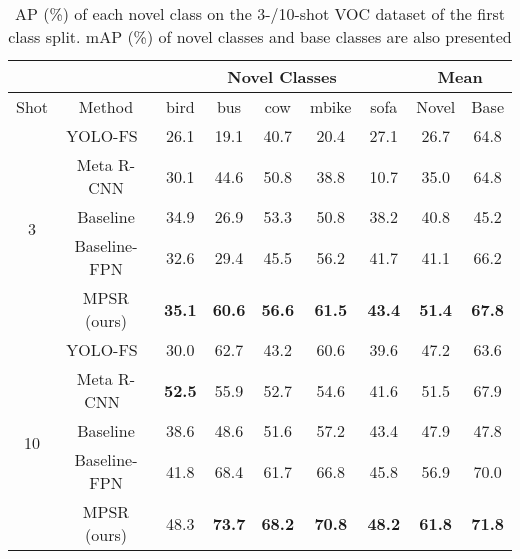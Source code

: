 \documentclass[runningheads]{llncs}
\begin{document}
\setlength{\tabcolsep}{2pt}
\begin{table}
	\begin{center}
		\caption{AP (\%) of each novel class on the 3-/10-shot VOC dataset of the first class split. mAP (\%) of novel classes and base classes are also presented}
		\label{table:detailedvoctable}
		\begin{tabular}{cc|ccccc|cc}
			\hline
			&            & \multicolumn{5}{c|}{Novel Classes}                                            & \multicolumn{2}{c}{Mean}     \\ \hline
			\multicolumn{1}{c|}{Shot}        & Method            & bird          & bus           & cow           & mbike         & sofa          & Novel         & Base          \\ \hline
			\multicolumn{1}{c|}{\multirow{5}{*}{3}}  & YOLO-FS~\cite{yolore}      & 26.1          & 19.1          & 40.7          & 20.4          & 27.1          & 26.7          & 64.8          \\
			\multicolumn{1}{c|}{}                    & Meta R-CNN\cite{metarcnn}   & 30.1          & 44.6          & 50.8          & 38.8          & 10.7          & 35.0          & 64.8          \\
			\multicolumn{1}{c|}{}                    & Baseline     & 34.9          & 26.9          & 53.3          & 50.8          & 38.2          & 40.8          & 45.2          \\
			\multicolumn{1}{c|}{}                    & Baseline-FPN & 32.6          & 29.4          & 45.5          & 56.2          & 41.7          & 41.1          & 66.2          \\
			\multicolumn{1}{c|}{}                    & MPSR (ours)  & \textbf{35.1} & \textbf{60.6} & \textbf{56.6} & \textbf{61.5} & \textbf{43.4} & \textbf{51.4} & \textbf{67.8} \\ \hline
			\multicolumn{1}{c|}{\multirow{5}{*}{10}} & YOLO-FS~\cite{yolore}      & 30.0          & 62.7          & 43.2          & 60.6          & 39.6          & 47.2          & 63.6          \\
			\multicolumn{1}{c|}{}                    & Meta R-CNN~\cite{metarcnn}   & \textbf{52.5} & 55.9          & 52.7          & 54.6          & 41.6          & 51.5          & 67.9          \\
			\multicolumn{1}{c|}{}                    & Baseline     & 38.6          & 48.6          & 51.6          & 57.2          & 43.4          & 47.9          & 47.8          \\
			\multicolumn{1}{c|}{}                    & Baseline-FPN & 41.8          & 68.4          & 61.7          & 66.8          & 45.8          & 56.9          & 70.0          \\
			\multicolumn{1}{c|}{}                    & MPSR (ours)  & 48.3          & \textbf{73.7} & \textbf{68.2} & \textbf{70.8} & \textbf{48.2} & \textbf{61.8} & \textbf{71.8} \\ \hline
		\end{tabular}
	\end{center}
\end{table}
\setlength{\tabcolsep}{1.4pt}
\end{document}
